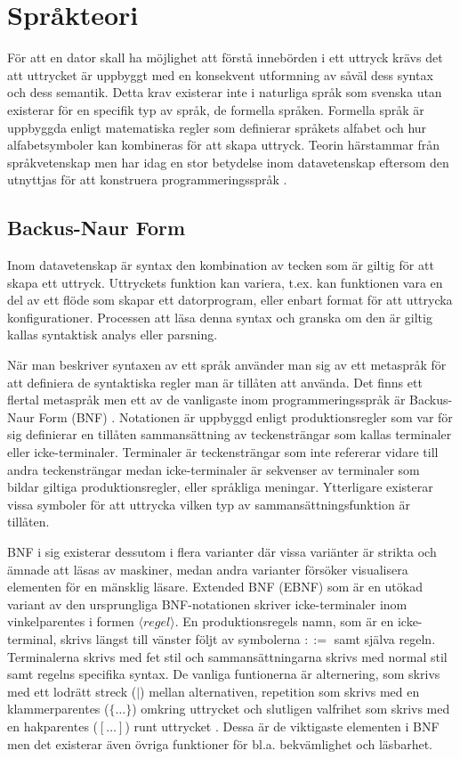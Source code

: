 \section{Språkteori}

För att en dator skall ha möjlighet att förstå innebörden i ett uttryck krävs
det att uttrycket är uppbyggt med en konsekvent utformning av såväl dess
syntax och dess semantik. Detta krav existerar inte i naturliga språk som
svenska utan existerar för en specifik typ av språk, de formella språken.
Formella språk är uppbyggda enligt matematiska regler som definierar språkets
alfabet och hur alfabetsymboler kan kombineras för att skapa uttryck. Teorin
härstammar från språkvetenskap men har idag en stor betydelse inom
datavetenskap eftersom den utnyttjas för att konstruera programmeringsspråk
\citep[s. 41]{sm09}.

\subsection{Backus-Naur Form}

Inom datavetenskap är syntax den kombination av tecken som är giltig för att
skapa ett uttryck. Uttryckets funktion kan variera, t.ex. kan funktionen
vara en del av ett flöde som skapar ett datorprogram, eller enbart format för
att uttrycka konfigurationer. Processen att läsa denna syntax och granska
om den är giltig kallas syntaktisk analys eller parsning.

När man beskriver syntaxen av ett språk använder man sig av ett metaspråk för
att definiera de syntaktiska regler man är tillåten att använda. Det finns ett
flertal metaspråk men ett av de vanligaste inom programmeringsspråk är
Backus-Naur Form (BNF) \citep[s. 27]{gd08}. Notationen är uppbyggd enligt
produktionsregler som var för sig definierar en tillåten sammansättning av
teckensträngar som kallas terminaler eller icke-terminaler. Terminaler är
teckensträngar som inte refererar vidare till andra teckensträngar medan
icke-terminaler är sekvenser av terminaler som bildar giltiga
produktionsregler, eller språkliga meningar. Ytterligare existerar vissa
symboler för att uttrycka vilken typ av sammansättningsfunktion är tillåten.

BNF i sig existerar dessutom i flera varianter där vissa variänter är strikta och
ämnade att läsas av maskiner, medan andra varianter försöker visualisera elementen
för en mänsklig läsare. Extended BNF (EBNF) som är en utökad variant av den
ursprungliga BNF-notationen skriver icke-terminaler inom vinkelparentes i
formen ${\langle}regel{\rangle}$. En produktionsregels namn, som är en
icke-terminal,
skrivs längst till vänster följt av symbolerna $::=$ samt själva regeln.
Terminalerna skrivs med fet stil och sammansättningarna skrivs med normal
stil samt regelns specifika syntax. De vanliga funtionerna är alternering, som
skrivs med ett lodrätt streck ($|$) mellan alternativen, repetition som skrivs
med en klammerparentes ($\{ \ldots \}$) omkring uttrycket och slutligen
valfrihet som skrivs med en hakparentes ($[ \ldots ]$) runt uttrycket
\citep[s. 28]{gd08}. Dessa är de viktigaste elementen i BNF men det existerar
även övriga funktioner för bl.a. bekvämlighet och läsbarhet.

